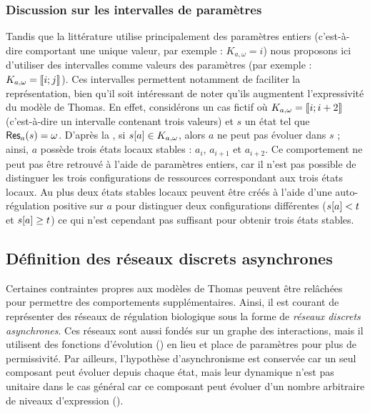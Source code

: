 
\subsubsection*{Discussion sur les intervalles de paramètres}
Tandis que la littérature utilise principalement des paramètres entiers
(c'est-à-dire comportant une unique valeur, par exemple : $K_{a,\omega} = i$)
nous proposons ici d'utiliser des intervalles comme valeurs des paramètres
(par exemple : $K_{a,\omega} = \mathopen{\llbracket}i\mathclose{};j\mathclose{\rrbracket}$).
Ces intervalles permettent notamment de faciliter la représentation,
bien qu'il soit intéressant de noter qu'ils augmentent l'expressivité du modèle de Thomas.
En effet, considérons un cas fictif où $K_{a,\omega} = \mathopen{\llbracket}i\mathclose{};i+2\mathclose{\rrbracket}$
(c'est-à-dire un intervalle contenant trois valeurs) et $s$ un état tel que
$\mathsf{Res}_{a}(s) = \omega$.
D'après la , si ${s[a]} \in K_{a,\omega}$, alors $a$
ne peut pas évoluer dans $s$ ; ainsi, $a$ possède trois états locaux stables :
$a_i$, $a_{i+1}$ et $a_{i+2}$.
Ce comportement ne peut pas être retrouvé à l'aide de paramètres entiers,
car il n'est pas possible de distinguer les trois configurations de ressources
correspondant aux trois états locaux.
Au plus deux états stables locaux peuvent être créés à l'aide d'une auto-régulation positive
sur $a$ pour distinguer deux configurations différentes
(${s[a]} < t$ et ${s[a]} \geq t$)
ce qui n'est cependant pas suffisant pour obtenir trois états stables.



\subsection{Définition des réseaux discrets asynchrones}

Certaines contraintes propres aux modèles de Thomas peuvent être relâchées pour permettre
des comportements supplémentaires.
Ainsi, il est courant de représenter des réseaux de régulation biologique
sous la forme de \emph{réseaux discrets asynchrones}.
Ces réseaux sont aussi fondés sur un graphe des interactions,
mais il utilisent des fonctions d'évolution () en lieu et place de paramètres
pour plus de permissivité.
Par ailleurs, l'hypothèse d'asynchronisme est conservée car un seul composant peut évoluer
depuis chaque état,
mais leur dynamique n'est pas unitaire dans le cas général
car ce composant peut évoluer d'un nombre arbitraire de niveaux d'expression
().

